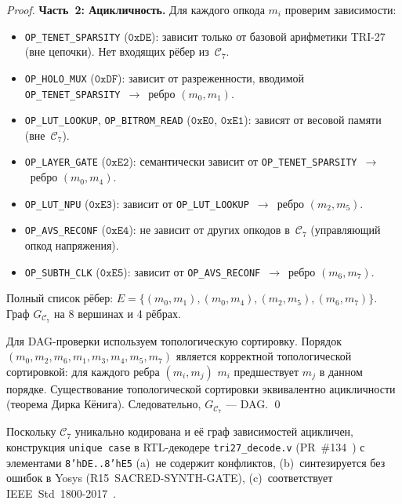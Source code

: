 \begin{proof}
\medskip
\noindent\textbf{Часть~2: Ацикличность.}
Для каждого опкода $m_i$ проверим зависимости:
\begin{itemize}
  \item \texttt{OP\_TENET\_SPARSITY} ($\mathtt{0xDE}$): зависит только
    от базовой арифметики TRI-27 (вне цепочки).  Нет входящих рёбер
    из~$\mathcal{C}_7$.
  \item \texttt{OP\_HOLO\_MUX} ($\mathtt{0xDF}$): зависит от разреженности,
    вводимой \texttt{OP\_TENET\_SPARSITY}~$\to$~ребро $(m_0, m_1)$.
  \item \texttt{OP\_LUT\_LOOKUP}, \texttt{OP\_BITROM\_READ}
    ($\mathtt{0xE0}$, $\mathtt{0xE1}$): зависят от весовой памяти (вне~$\mathcal{C}_7$).
  \item \texttt{OP\_LAYER\_GATE} ($\mathtt{0xE2}$): семантически зависит
    от \texttt{OP\_TENET\_SPARSITY}~$\to$~ребро $(m_0, m_4)$.
  \item \texttt{OP\_LUT\_NPU} ($\mathtt{0xE3}$): зависит от \texttt{OP\_LUT\_LOOKUP}~$\to$~ребро $(m_2, m_5)$.
  \item \texttt{OP\_AVS\_RECONF} ($\mathtt{0xE4}$): не зависит от других
    опкодов в~$\mathcal{C}_7$ (управляющий опкод напряжения).
  \item \texttt{OP\_SUBTH\_CLK} ($\mathtt{0xE5}$): зависит от
    \texttt{OP\_AVS\_RECONF}~$\to$~ребро $(m_6, m_7)$.
\end{itemize}

Полный список рёбер: $E = \{(m_0, m_1), (m_0, m_4), (m_2, m_5), (m_6, m_7)\}$.
Граф $G_{\mathcal{C}_7}$ на 8 вершинах и 4 рёбрах.

Для DAG-проверки используем топологическую сортировку.
Порядок $(m_0, m_2, m_6, m_1, m_3, m_4, m_5, m_7)$ является
корректной топологической сортировкой: для каждого ребра $(m_i, m_j)$
$m_i$ предшествует $m_j$ в данном порядке.  Существование
топологической сортировки эквивалентно ацикличности (теорема Дирка Кёнига).
Следовательно, $G_{\mathcal{C}_7}$ — DAG.
\qed
\end{proof}

\begin{corollary}
\label{cor:synthesisability}
Поскольку $\mathcal{C}_7$ уникально кодирована и её граф зависимостей
ацикличен, конструкция \texttt{unique~case} в RTL-декодере
\texttt{tri27\_decode.v} (PR~\#134~\cite{pr_trinity_fpga_134})
с элементами \texttt{8'hDE..8'hE5}
(a)~не содержит конфликтов, (b)~синтезируется без ошибок в Yosys
(R15~SACRED-SYNTH-GATE), (c)~соответствует IEEE~Std~1800-2017~\cite{ieee_sv_2017}.
\end{corollary}

